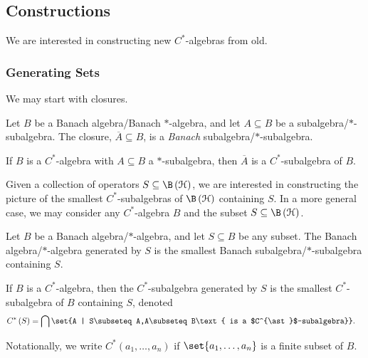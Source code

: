 \documentclass[10pt]{mypackage}
\begin{document}
\subsection{Constructions}%
We are interested in constructing new $C^{\ast}$-algebras from old.
\subsubsection{Generating Sets}%
We may start with closures.
\begin{lemma}
  Let $B$ be a Banach algebra/Banach $\ast$-algebra, and let $A\subseteq B$ be a subalgebra/$\ast$-subalgebra. The closure, $\overline{A}\subseteq B$, is a \textit{Banach} subalgebra/$\ast$-subalgebra.\newline

  If $B$ is a $C^{\ast}$-algebra with $A\subseteq B$ a $\ast$-subalgebra, then $\overline{A}$ is a $C^{\ast}$-subalgebra of $B$.
\end{lemma}
Given a collection of operators $S\subseteq \B\left(\mathcal{H}\right)$, we are interested in constructing the picture of the smallest $C^{\ast}$-subalgebras of $\B\left(\mathcal{H}\right)$ containing $S$. In a more general case, we may consider any $C^{\ast}$-algebra $B$ and the subset $S\subseteq \B\left(\mathcal{H}\right)$.
\begin{definition}
  Let $B$ be a Banach algebra/$\ast$-algebra, and let $S\subseteq B$ be any subset. The Banach algebra/$\ast$-algebra generated by $S$ is the smallest Banach subalgebra/$\ast$-subalgebra containing $S$.\newline

  If $B$ is a $C^{\ast}$-algebra, then the $C^{\ast}$-subalgebra generated by $S$ is the smallest $C^{\ast}$-subalgebra of $B$ containing $S$, denoted
  \begin{align*}
    C^{\ast}\left(S\right) &= \bigcap \set{A | S\subseteq A,A\subseteq B\text{ is a $C^{\ast}$-subalgebra}}.
  \end{align*}
\end{definition}
Notationally, we write $C^{\ast}\left(a_1,\dots,a_n\right)$ if $\set{a_1,\dots,a_n}$ is a finite subset of $B$.\newline
\end{document}
